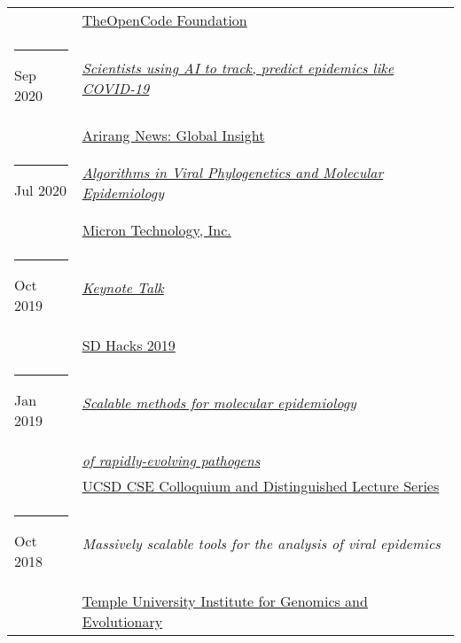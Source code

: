 \documentclass[margin,line]{res}
\begin{document}
\begin{resume}
\begin{longtable}{@{}p{0.7in}p{4in}}
\hspace*{-4mm} & \hspace{4mm} \href{https://www.theopencode.org/}{TheOpenCode Foundation}\\
\hspace*{-4mm} \rule{-1mm}{5mm} Sep 2020 & \href{https://youtu.be/xHSFWtLL8bc}{\textit{Scientists using AI to track, predict epidemics like COVID-19}}\\*
\hspace*{-4mm} & \hspace{4mm} \href{https://www.arirang.com/}{Arirang News: Global Insight}\\
\hspace*{-4mm} \rule{-1mm}{5mm} Jul 2020 & \href{https://www.micron.com/}{\textit{Algorithms in Viral Phylogenetics and Molecular Epidemiology}}\\*
\hspace*{-4mm} & \hspace{4mm} \href{https://www.micron.com/}{Micron Technology, Inc.}\\
\hspace*{-4mm} \rule{-1mm}{5mm} Oct 2019 & \href{https://www.sdhacks.io/}{\textit{Keynote Talk}}\\*
\hspace*{-4mm} & \hspace{4mm} \href{https://www.sdhacks.io/}{SD Hacks 2019}\\
\hspace*{-4mm} \rule{-1mm}{5mm} Jan 2019 & \href{https://cse.ucsd.edu/about/scalable-methods-molecular-epidemiology-rapidly-evolving-pathogens}{\textit{Scalable methods for molecular epidemiology}}\\*
\hspace*{-4mm} & \hspace{4mm} \href{https://cse.ucsd.edu/about/scalable-methods-molecular-epidemiology-rapidly-evolving-pathogens}{\textit{of rapidly-evolving pathogens}}\\*
\hspace*{-4mm} & \hspace{4mm} \href{https://cse.ucsd.edu/about/cse-colloquium-dls/2018-2019}{UCSD CSE Colloquium and Distinguished Lecture Series}\\
\hspace*{-4mm} \rule{-1mm}{5mm} Oct 2018 & \textit{Massively scalable tools for the analysis of viral epidemics}\\*
\hspace*{-4mm} & \hspace{4mm} \href{http://igem.temple.edu/home}{Temple University Institute for Genomics and Evolutionary}\\*

\end{longtable}
\end{resume}
\end{document}
